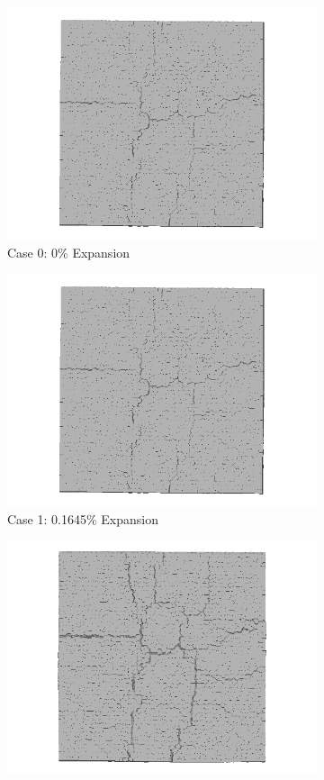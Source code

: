 \begin{figure}[!h]
\centering

    \begin{subfigure}{.5\textwidth}
      \centering
      \includegraphics[width=.8\linewidth]{Files/exp_3D/DEF/A15X0C_1_3ds.png}
    \caption{Case 0: 0\% Expansion}
    \end{subfigure}%
    \begin{subfigure}{.5\textwidth}
      \centering
      \includegraphics[width=.8\linewidth]{Files/exp_3D/DEF/A15X0C_1_3ds.png}
    \caption{Case 1: 0.1645\% Expansion}
    \end{subfigure}
    \begin{subfigure}{.5\textwidth}
      \centering
      \includegraphics[width=.8\linewidth]{Files/exp_3D/DEF/A15X0C_2_3ds.png}

\end{subfigure}
\end{figure}
